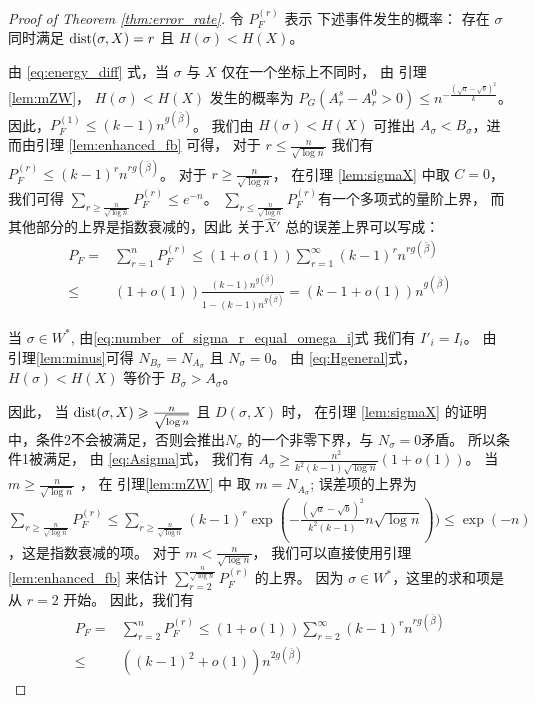 \begin{proof}[Proof of Theorem \ref{thm:error_rate}]

	令 $P_F^{(r)}$ 表示
  下述事件发生的概率：
  存在 $\sigma$ 同时满足
  $\operatorname{dist}(\sigma, X) = r$ 且
  $H(\sigma) < H(X)$。
	
	由 \eqref{eq:energy_diff} 式，当
  $\sigma$ 与 $X$ 仅在一个坐标上不同时，
  由 引理 \ref{lem:mZW}，
  $H(\sigma) < H(X)$ 发生的概率为
	$P_G(A_r^s - A_r^0 > 0) \leq n^{-\frac{(\sqrt{a}-\sqrt{b})^2}{k}}$。
  因此，$P_F^{(1)}  \leq (k-1)n^{g(\bar{\beta})}$。
	我们由 $H(\sigma) < H(X)$ 可推出 $A_{\sigma} < B_{\sigma}$，进而由引理 \ref{lem:enhanced_fb}
  可得，
  对于 $ r \leq \frac{n}{\sqrt{\log n}}$
  我们有
  $P_F^{(r)} \leq (k-1)^r n^{rg(\bar{\beta})}$。
	对于
  $ r \geq \frac{n}{\sqrt{\log n}}$， 在引理
  \ref{lem:sigmaX} 中取 $C=0$，我们可得
  $\sum_{r\geq \frac{n}{\sqrt{\log n}}}P_F^{(r)} \leq e^{-n}$。
	$\sum_{r\leq \frac{n}{\sqrt{\log n}}}P_F^{(r)}$有一个多项式的量阶上界，
  而其他部分的上界是指数衰减的，因此
  关于$\hat{X}'$ 总的误差上界可以写成：
  \begin{align*}
	P_F = & \sum_{r=1}^n P_F^{(r)} \leq (1+o(1)) \sum_{r=1}^{\infty} (k-1)^r n^{rg(\bar{\beta})}\\
	\leq & (1+o(1))\frac{(k-1) n^{g(\bar{\beta})}}{1-(k-1) n^{g(\bar{\beta})}} = (k-1+o(1))n^{g(\bar{\beta})}
	\end{align*}   
	
当 $\sigma \in W^*$, 由\eqref{eq:number_of_sigma_r_equal_omega_i}式
 我们有 $I'_i = I_i$。
由 引理\ref{lem:minus}可得
$N_{B_{\sigma}} = 
N_{A_{\sigma}}$
且 $N_{\sigma} = 0$。
由 \eqref{eq:Hgeneral}式，
$H(\sigma) < H(X)$ 等价于
$B_{\sigma} > A_{\sigma}$。

因此，
当 $ \operatorname{dist}(\sigma, X) \geqslant \frac{n}{\sqrt{\log n} }$ 且 $D(\sigma, X)$
时，
在引理 \ref{lem:sigmaX}
的证明中，条件2不会被满足，否则会推出$N_{\sigma}$
的一个非零下界，与  $N_{\sigma} = 0$矛盾。
所以条件1被满足，
由 \eqref{eq:Asigma}式，
我们有 $A_{\sigma} \geq \frac{n^2}{k^2(k-1)\sqrt{\log n} } (1+o(1))$。
当 $m \geq \frac{n}{ \sqrt{\log n}}$ ，
在 引理\ref{lem:mZW} 中 取
$m=N_{A_{\sigma}}$;
误差项的上界为 $\sum_{r\geq \frac{n}{ \sqrt{\log n}}} P_F^{(r)} \leq \sum_{r\geq \frac{n}{ \sqrt{\log n}}} (k-1)^r \exp(-\frac{(\sqrt{a} - \sqrt{b})^2}{k^2(k-1)} n \sqrt{\log n}))
\leq \exp(-n)$，这是指数衰减的项。
对于 $m < \frac{n}{ \sqrt{\log n}}$，
我们可以直接使用引理 \ref{lem:enhanced_fb}  
来估计 $\sum_{r=2}^{\frac{n}{ \sqrt{\log n}}} P_F^{(r)}$
的上界。
因为 $\sigma \in W^*$，这里的求和项是从 $r=2$ 开始。
因此，我们有
\begin{align*}
P_F = & \sum_{r=2}^n P_F^{(r)} \leq (1+o(1)) \sum_{r=2}^{\infty} (k-1)^r n^{rg(\bar{\beta})}\\
\leq & ((k-1)^2+o(1))n^{2g(\bar{\beta})}
\end{align*}
\end{proof}